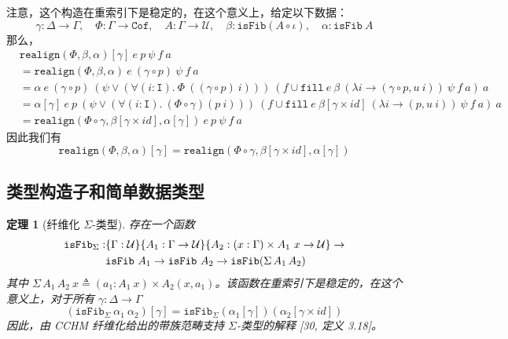 \documentclass{ctexrep}
\theoremstyle{plain}
\newtheorem{theorem}{定理}[section]
\theoremstyle{definition}
\theoremstyle{remark}
\newcommand{\Cof}{\mathtt{Cof}}
\begin{document}
注意，这个构造在重索引下是稳定的，在这个意义上，给定以下数据：
\[
\gamma : \Delta \to \Gamma, \quad \Phi : \Gamma \to \Cof, \quad A : \Gamma \to \mathcal{U}, \quad \beta : \mathtt{isFib}(A \circ \iota), \quad \alpha : \mathtt{isFib}\ A
\]
那么，
\begin{align*}
&\mathtt{realign}(\Phi, \beta, \alpha)[\gamma]\ e\ p\ \psi\ f\ a \\
&= \mathtt{realign}(\Phi, \beta, \alpha)\ e\ (\gamma \circ p)\ \psi\ f\ a \\
&= \alpha\ e\ (\gamma \circ p)\ (\psi \lor (\forall(i : \mathtt{I}).\ \Phi\ ((\gamma \circ p)\ i)))\ (f \cup \mathtt{fill}\ e\ \beta\ (\lambda i \to (\gamma \circ p, u\ i))\ \psi\ f\ a)\ a \\
&= \alpha[\gamma]\ e\ p\ (\psi \lor (\forall(i : \mathtt{I}).\ (\Phi \circ \gamma)(p\ i)))\ (f \cup \mathtt{fill}\ e\ \beta[\gamma \times  id ]\ (\lambda i \to (p, u\ i))\ \psi\ f\ a)\ a \\
&= \mathtt{realign}(\Phi \circ \gamma, \beta[\gamma \times  id ], \alpha[\gamma])\ e\ p\ \psi\ f\ a
\end{align*}
因此我们有
\[
\mathtt{realign}(\Phi, \beta, \alpha)[\gamma] = \mathtt{realign}(\Phi \circ \gamma, \beta[\gamma \times  id ], \alpha[\gamma])
\]

\subsection{类型构造子和简单数据类型}

\begin{theorem}[纤维化 $\Sigma$-类型]
存在一个函数
\begin{align}
\mathtt{isFib}_\Sigma : &\{\Gamma : \mathcal{U}\}\{A_1 : \Gamma \to \mathcal{U}\}\{A_2 : (x : \Gamma) \times A_1\ x \to \mathcal{U}\} \to \\
&\mathtt{isFib}\ A_1 \to \mathtt{isFib}\ A_2 \to \mathtt{isFib}(\Sigma\,A_1\,A_2)\notag
\end{align}
其中 $\Sigma\,A_1\,A_2\ x \triangleq (a_1 : A_1\ x) \times A_2(x, a_1)$。该函数在重索引下是稳定的，在这个意义上，对于所有 $\gamma : \Delta \to \Gamma$
\begin{equation}
(\mathtt{isFib}_\Sigma\ \alpha_1\ \alpha_2)[\gamma] = \mathtt{isFib}_\Sigma(\alpha_1[\gamma])(\alpha_2[\gamma \times  id ])
\end{equation}
因此，由 CCHM 纤维化给出的带族范畴支持 $\Sigma$-类型的解释 [30, 定义 3.18]。
\end{theorem}
\end{document}
